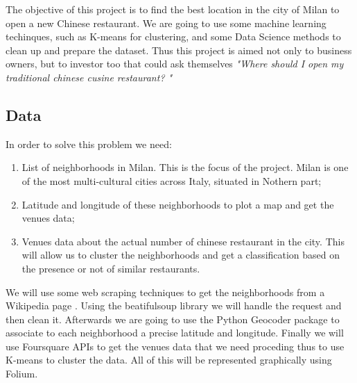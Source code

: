 \documentclass[12pt]{article} %
\newcounter{other}
\begin{document}
The objective of this project is to find the best location in the city of Milan to open a new Chinese restaurant. We are going to use some machine learning techinques, such as K-means for clustering, and some Data Science methods to clean up and prepare the dataset. Thus this project is aimed not only to business owners, but to investor too that could ask themselves \textit{"Where should I open my traditional chinese cusine restaurant? "}

\subsection {Data}

In order to solve this problem we need:
\begin{enumerate}
	\item List of neighborhoods in Milan. This is the focus of the project. Milan is one of the most multi-cultural cities across Italy, situated in Nothern part;
	\item Latitude and longitude of these neighborhoods to plot a map and get the venues data;
	\item Venues data about the actual number of chinese restaurant in the city. This will allow us to cluster the neighborhoods and get a classification based on the presence or not of similar restaurants.
\end{enumerate}

We will use some web scraping techniques to get the neighborhoods from a Wikipedia page \cite{2:wi}. Using the beatifulsoup library we will handle the request and then clean it. Afterwards we are going to use the Python Geocoder package to associate to each neighborhood a precise latitude and longitude. Finally we will use Foursquare APIs to get the venues data that we need proceding thus to use K-means to cluster the data. All of this will be represented graphically using Folium.













\end{document}
